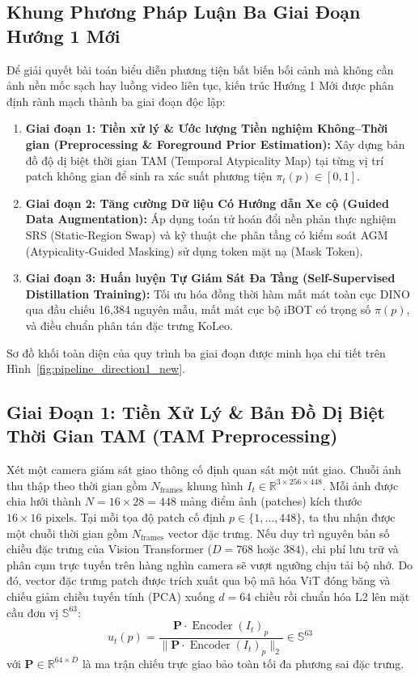 \documentclass[11pt,a4paper]{article}
\begin{document}
\subsection{Khung Phương Pháp Luận Ba Giai Đoạn Hướng 1 Mới}
Để giải quyết bài toán biểu diễn phương tiện bất biến bối cảnh mà không cần ảnh nền mốc sạch hay luồng video liên tục, kiến trúc Hướng 1 Mới được phân định rành mạch thành ba giai đoạn độc lập:
\begin{enumerate}
    \item \textbf{Giai đoạn 1: Tiền xử lý \& Ước lượng Tiền nghiệm Không--Thời gian (Preprocessing \& Foreground Prior Estimation):} Xây dựng bản đồ độ dị biệt thời gian TAM (Temporal Atypicality Map) tại từng vị trí patch không gian để sinh ra xác suất phương tiện $\pi_t(p) \in [0, 1]$.
    \item \textbf{Giai đoạn 2: Tăng cường Dữ liệu Có Hướng dẫn Xe cộ (Guided Data Augmentation):} Áp dụng toán tử hoán đổi nền phản thực nghiệm SRS (Static-Region Swap) và kỹ thuật che phân tầng có kiểm soát AGM (Atypicality-Guided Masking) sử dụng token mặt nạ (Mask Token).
    \item \textbf{Giai đoạn 3: Huấn luyện Tự Giám Sát Đa Tầng (Self-Supervised Distillation Training):} Tối ưu hóa đồng thời hàm mất mát toàn cục DINO qua đầu chiếu 16,384 nguyên mẫu, mất mát cục bộ iBOT có trọng số $\pi(p)$, và điều chuẩn phân tán đặc trưng KoLeo.
\end{enumerate}
Sơ đồ khối toàn diện của quy trình ba giai đoạn được minh họa chi tiết trên Hình~\ref{fig:pipeline_direction1_new}.

\subsection{Giai Đoạn 1: Tiền Xử Lý \& Bản Đồ Dị Biệt Thời Gian TAM (TAM Preprocessing)}
Xét một camera giám sát giao thông cố định quan sát một nút giao. Chuỗi ảnh thu thập theo thời gian gồm $N_{\text{frames}}$ khung hình $I_t \in \mathbb{R}^{3 \times 256 \times 448}$. Mỗi ảnh được chia lưới thành $N = 16 \times 28 = 448$ mảng điểm ảnh (patches) kích thước $16 \times 16\text{ pixels}$.
Tại mỗi tọa độ patch cố định $p \in \{1, \dots, 448\}$, ta thu nhận được một chuỗi thời gian gồm $N_{\text{frames}}$ vector đặc trưng. Nếu duy trì nguyên bản số chiều đặc trưng của Vision Transformer ($D = 768$ hoặc $384$), chi phí lưu trữ và phân cụm trực tuyến trên hàng nghìn camera sẽ vượt ngưỡng chịu tải bộ nhớ. Do đó, vector đặc trưng patch được trích xuất qua bộ mã hóa ViT đóng băng và chiếu giảm chiều tuyến tính (PCA) xuống $d = 64$ chiều rồi chuẩn hóa L2 lên mặt cầu đơn vị $\mathbb{S}^{63}$:
\begin{equation}
    u_t(p) = \frac{\mathbf{P} \cdot \operatorname{Encoder}(I_t)_p}{\|\mathbf{P} \cdot \operatorname{Encoder}(I_t)_p\|_2} \in \mathbb{S}^{63}
\end{equation}
với $\mathbf{P} \in \mathbb{R}^{64 \times D}$ là ma trận chiếu trực giao bảo toàn tối đa phương sai đặc trưng.
\end{document}
